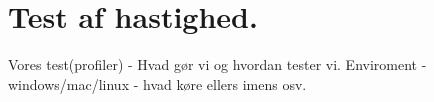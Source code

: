 \documentclass[class=report, crop=false]{standalone}
\begin{document}
    \section{Test af hastighed.}
    Vores test(profiler) -\> Hvad gør vi og hvordan tester vi. Enviroment - windows/mac/linux - hvad køre ellers imens osv.
\end{document}
